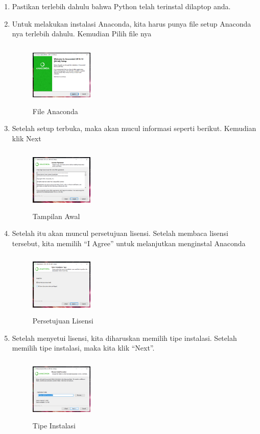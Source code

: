\begin{enumerate}
\item Pastikan terlebih dahulu bahwa Python telah terinstal dilaptop anda.
\item Untuk melakukan instalasi Anaconda, kita harus punya file setup Anaconda nya terlebih dahulu. Kemudian Pilih file nya
\begin{figure}[!htbp]
    \centering
    \includegraphics[width=3cm,height=3cm]{figures/1.png}
    \caption{File Anaconda}
    \label{file}
    \end{figure}

\item Setelah setup terbuka, maka akan mucul informasi seperti berikut. Kemudian klik Next
\begin{figure}[!htbp]
    \centering
    \includegraphics[width=3cm,height=3cm]{figures/2.png}
    \caption{Tampilan Awal}
    \label{awal}
    \end{figure}

\item Setelah itu akan muncul persetujuan lisensi. Setelah membaca lisensi tersebut, kita memilih “I Agree” untuk melanjutkan menginstal Anaconda
\begin{figure}[!htbp]
    \centering
    \includegraphics[width=3cm,height=3cm]{figures/3.png}
    \caption{Persetujuan Lisensi}
    \label{lisensi}
    \end{figure}

\item Setelah menyetui lisensi, kita diharuskan memilih tipe instalasi. Setelah memilih tipe instalasi, maka kita klik “Next”.
\begin{figure}[!htbp]
    \centering
    \includegraphics[width=3cm,height=3cm]{figures/4.png}
    \caption{Tipe Instalasi}
    \label{instalasi}
    \end{figure}


\end{enumerate}
